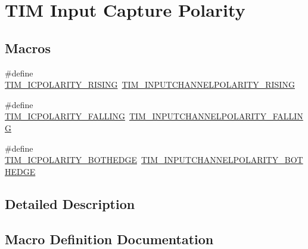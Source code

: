 \hypertarget{group___t_i_m___input___capture___polarity}{}\section{T\+IM Input Capture Polarity}
\label{group___t_i_m___input___capture___polarity}
\subsection*{Macros}
\begin{DoxyCompactItemize}
\item 
\#define \hyperlink{group___t_i_m___input___capture___polarity_gac79dd2a7ba97e5aac0bb9cbdc2d02ee1}{T\+I\+M\+\_\+\+I\+C\+P\+O\+L\+A\+R\+I\+T\+Y\+\_\+\+R\+I\+S\+I\+NG}~\hyperlink{group___t_i_m___input___channel___polarity_ga4f4cede88a4ad4b33e81f2567e9bb08f}{T\+I\+M\+\_\+\+I\+N\+P\+U\+T\+C\+H\+A\+N\+N\+E\+L\+P\+O\+L\+A\+R\+I\+T\+Y\+\_\+\+R\+I\+S\+I\+NG}
\item 
\#define \hyperlink{group___t_i_m___input___capture___polarity_gaec0c00d0b749e8c18101cefcce7c32f6}{T\+I\+M\+\_\+\+I\+C\+P\+O\+L\+A\+R\+I\+T\+Y\+\_\+\+F\+A\+L\+L\+I\+NG}~\hyperlink{group___t_i_m___input___channel___polarity_ga07441a8c0a52234e30f471c23803450c}{T\+I\+M\+\_\+\+I\+N\+P\+U\+T\+C\+H\+A\+N\+N\+E\+L\+P\+O\+L\+A\+R\+I\+T\+Y\+\_\+\+F\+A\+L\+L\+I\+NG}
\item 
\#define \hyperlink{group___t_i_m___input___capture___polarity_ga7a340c94a7bd0fa4a915afa8788e0b71}{T\+I\+M\+\_\+\+I\+C\+P\+O\+L\+A\+R\+I\+T\+Y\+\_\+\+B\+O\+T\+H\+E\+D\+GE}~\hyperlink{group___t_i_m___input___channel___polarity_gaab2598881d1f19158e77723c5d29d6ac}{T\+I\+M\+\_\+\+I\+N\+P\+U\+T\+C\+H\+A\+N\+N\+E\+L\+P\+O\+L\+A\+R\+I\+T\+Y\+\_\+\+B\+O\+T\+H\+E\+D\+GE}
\end{DoxyCompactItemize}


\subsection{Detailed Description}


\subsection{Macro Definition Documentation}
\mbox{\label{group___t_i_m___input___capture___polarity_ga7a340c94a7bd0fa4a915afa8788e0b71}} 
